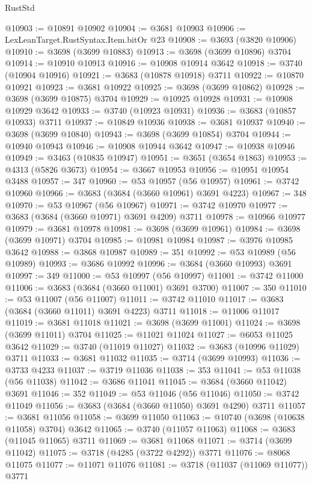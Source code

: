 \begin{lexlean}{RustStd}
\begin{coremodule}
@10903 := @10891 @10902
@10904 := @3681 @10903
@10906 := LexLeanTarget.RustSyntax.Item.bitOr @23
@10908 := @3693 (@3820 @10906)
@10910 := @3698 (@3699 @10883)
@10913 := @3698 (@3699 @10896) @3704
@10914 := @10910 @10913
@10916 := @10908 @10914 @3642
@10918 := @3740 (@10904 @10916)
@10921 := @3683 (@10878 @10918) @3711
@10922 := @10870 @10921
@10923 := @3681 @10922
@10925 := @3698 (@3699 @10862)
@10928 := @3698 (@3699 @10875) @3704
@10929 := @10925 @10928
@10931 := @10908 @10929 @3642
@10933 := @3740 (@10923 @10931)
@10936 := @3683 (@10857 @10933) @3711
@10937 := @10849 @10936
@10938 := @3681 @10937
@10940 := @3698 (@3699 @10840)
@10943 := @3698 (@3699 @10854) @3704
@10944 := @10940 @10943
@10946 := @10908 @10944 @3642
@10947 := @10938 @10946
@10949 := @3463 (@10835 @10947)
@10951 := @3651 (@3654 @1863)
@10953 := @4313 (@5826 @3673)
@10954 := @3667 @10953
@10956 := @10951 @10954 @3488
@10957 := 347
@10960 := @53 @10957 (@56 @10957)
@10961 := @3742 @10960
@10966 := @3683 (@3684 (@3660 @10961) @3691 @4223)
@10967 := 348
@10970 := @53 @10967 (@56 @10967)
@10971 := @3742 @10970
@10977 := @3683 (@3684 (@3660 @10971) @3691 @4209) @3711
@10978 := @10966 @10977
@10979 := @3681 @10978
@10981 := @3698 (@3699 @10961)
@10984 := @3698 (@3699 @10971) @3704
@10985 := @10981 @10984
@10987 := @3976 @10985 @3642
@10988 := @3868 @10987
@10989 := 351
@10992 := @53 @10989 (@56 @10989)
@10993 := @3686 @10992
@10996 := @3684 (@3660 @10993) @3691
@10997 := 349
@11000 := @53 @10997 (@56 @10997)
@11001 := @3742 @11000
@11006 := @3683 (@3684 (@3660 @11001) @3691 @3700)
@11007 := 350
@11010 := @53 @11007 (@56 @11007)
@11011 := @3742 @11010
@11017 := @3683 (@3684 (@3660 @11011) @3691 @4223) @3711
@11018 := @11006 @11017
@11019 := @3681 @11018
@11021 := @3698 (@3699 @11001)
@11024 := @3698 (@3699 @11011) @3704
@11025 := @11021 @11024
@11027 := @6053 @11025 @3642
@11029 := @3740 (@11019 @11027)
@11032 := @3683 (@10996 @11029) @3711
@11033 := @3681 @11032
@11035 := @3714 (@3699 @10993)
@11036 := @3733 @4233
@11037 := @3719 @11036
@11038 := 353
@11041 := @53 @11038 (@56 @11038)
@11042 := @3686 @11041
@11045 := @3684 (@3660 @11042) @3691
@11046 := 352
@11049 := @53 @11046 (@56 @11046)
@11050 := @3742 @11049
@11056 := @3683 (@3684 (@3660 @11050) @3691 @4290) @3711
@11057 := @3681 @11056
@11058 := @3699 @11050
@11063 := @10740 (@3698 (@10638 @11058) @3704) @3642
@11065 := @3740 (@11057 @11063)
@11068 := @3683 (@11045 @11065) @3711
@11069 := @3681 @11068
@11071 := @3714 (@3699 @11042)
@11075 := @3718 (@4285 (@3722 @4292)) @3771
@11076 := @8068 @11075
@11077 := @11071 @11076
@11081 := @3718 (@11037 (@11069 @11077)) @3771

\end{coremodule}
\end{lexlean}
